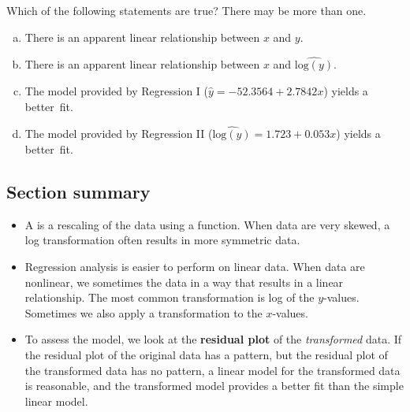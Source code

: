\begin{exercisewrap}
\begin{nexercise}Which of the following statements are true?  There may be more than one.\footnotemark 
\begin{enumerate}[(a)]
\item There is an apparent linear relationship between $x$ and $y$.
\item There is an apparent linear relationship between $x$ and $\widehat{\text{log}(y)}$.
\item The model provided by Regression I ($\hat{y} = -52.3564 + 2.7842 x$) yields a better~fit.
\item The model provided by Regression II ($\widehat{\text{log}(y)} = 1.723 +0.053 x$) yields a better~fit.
\end{enumerate}
\end{nexercise}
\end{exercisewrap}


\D{\newpage}

\subsection*{Section summary}
\begin{itemize}
\item A  is a rescaling of the data using a function.  When data are very skewed, a log transformation often results in more symmetric data.

\item Regression analysis is easier to perform on linear data. When data are nonlinear, we sometimes  the data in a way that results in a linear relationship. The most common transformation is log of the $y$-values. Sometimes we also apply a transformation to the $x$-values. 

\item To assess the model, we look at the \textbf{residual plot} of the \emph{transformed} data.  If the residual plot of the original data has a pattern, but the residual plot of the transformed data has no pattern, a linear model for the transformed data is reasonable, and the transformed model provides a better fit than the simple linear model.

\end{itemize}


